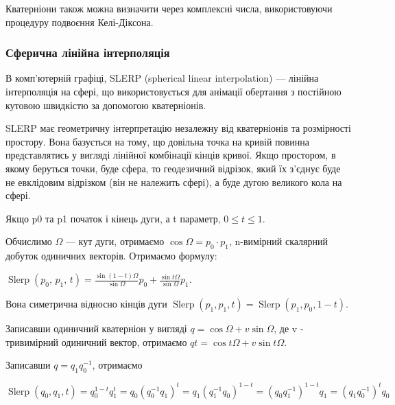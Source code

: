 Кватерніони також можна визначити через комплексні числа, використовуючи процедуру подвоєння Келі-Діксона.

\subsubsection{Сферична лінійна інтерполяція}

В комп'ютерній графіці, SLERP (spherical linear interpolation) — лінійна інтерполяція на сфері, що використовується для анімації обертання з постійною кутовою швидкістю за допомогою кватерніонів.

SLERP має геометричну інтерпретацію незалежну від кватерніонів та розмірності простору. Вона базується на тому, що довільна точка на кривій повинна представлятись у вигляді лінійної комбінації кінців кривої. Якщо простором, в якому беруться точки, буде сфера, то геодезичний відрізок, який їх з'єднує буде не евклідовим відрізком (він не належить сфері), а буде дугою великого кола на сфері.

Якщо p0 та p1 початок і кінець дуги, а t параметр, $0 \le t \le 1$.

Обчислимо $\Omega$ — кут дуги, отримаємо $\cos{\Omega} = p_0 \cdot p_1$, n-вимірний скалярний добуток одиничних векторів. Отримаємо формулу:
\begin{center}
  $\operatorname{Slerp}(p_0, \, p_1, \, t) = \frac{\sin {(1-t)\Omega}}{\sin \Omega} p_0 + \frac{\sin t\Omega}{\sin \Omega} p_1.$
\end{center}

Вона симетрична відносно кінців дуги
$\operatorname{Slerp}(p_1,p_1,t) = \operatorname{Slerp}(p_1,p_0,1-t)$.

Записавши одиничний кватерніон у вигляді $q = \cos{\Omega} + v\sin{\Omega}$, де v - тривимірний одиничний вектор, отримаємо $qt = \cos{t\Omega} + v\sin{t\Omega}$.

Записавши $q = q_1q_0^{-1}$, отримаємо

$\operatorname{Slerp}(q_0, q_1, t) = q_0^{1-t} q_1^t
=q_0 (q_0^{-1} q_1)^t
=q_1 (q_1^{-1} q_0)^{1-t}
=(q_0 q_1^{-1})^{1-t} q_1
=(q_1 q_0^{-1})^t q_0
$